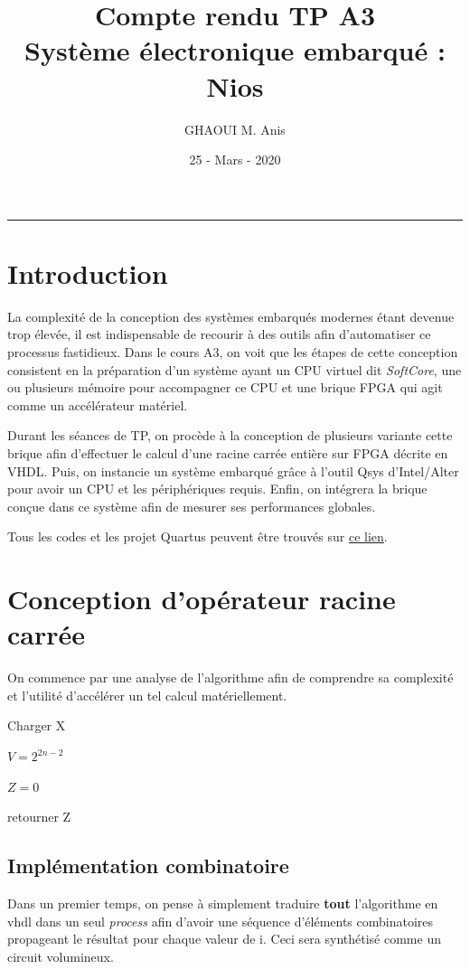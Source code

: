 \documentclass[12pt,a4paper]{article}
\author{GHAOUI M. Anis}
\title{Compte rendu TP A3 \\ Système électronique embarqué : Nios}
\date{25 - Mars - 2020}
\begin{document}
\maketitle
\hrule
\tableofcontents
\newpage

\section{Introduction}
La complexité de la conception des systèmes embarqués modernes étant devenue trop élevée, il est indispensable de recourir à des outils afin d'automatiser ce processus fastidieux. Dans le cours A3, on voit que les étapes de cette conception consistent en la préparation d'un système ayant un CPU virtuel dit \textit{SoftCore}, une ou plusieurs mémoire pour accompagner ce CPU et une brique FPGA qui agit comme un accélérateur matériel. 

Durant les séances de TP, on procède à la conception de plusieurs variante cette brique afin d'effectuer le calcul d'une racine carrée entière sur FPGA décrite en VHDL. Puis, on instancie un système embarqué grâce à l'outil Qsys d'Intel/Alter pour avoir un CPU et les périphériques requis. Enfin, on intégrera la brique conçue dans ce système afin de mesurer ses performances globales. 

Tous les codes et les projet Quartus peuvent être trouvés sur \href{https://github.com/anisghaoui/A3}{ce lien}.

\section{Conception d'opérateur racine carrée}
On commence par une analyse de l'algorithme afin de comprendre sa complexité et l'utilité d'accélérer un tel calcul matériellement.

\begin{algorithm}[H]
	Charger X
	
	$V = 2^{2n-2}$
	
	$Z=0$
	
	retourner Z
\end{algorithm}

\subsection{Implémentation combinatoire}
Dans un premier temps, on pense à simplement traduire \textbf{tout} l'algorithme en vhdl dans un seul \textit{process} afin d'avoir une séquence d'éléments combinatoires propageant le résultat pour chaque valeur de i. Ceci sera synthétisé comme un circuit volumineux.
\end{document}

